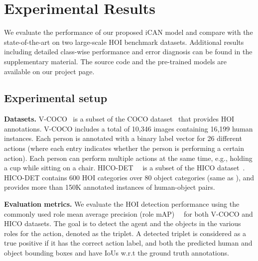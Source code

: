 \documentclass{bmvc2k}
\newlength\secmargin
\newcommand {\para}[1]{\vspace{1.5mm} \noindent \textbf{#1}}
\begin{document}
 \vspace{\secmargin}
\section{Experimental Results}
\label{sec:results}
\vspace{\secmargin}


We evaluate the performance of our proposed iCAN model and compare with the state-of-the-art on two large-scale HOI benchmark datasets.
Additional results including detailed class-wise performance and error diagnosis can be found in the supplementary material.
The source code and the pre-trained models are available on our project page.


\vspace{\secmargin}
\subsection{Experimental setup}
\vspace{\secmargin}

\para{Datasets.}
{V-COCO}~\cite{Gupta-SemanticRoleLabeling} is a subset of the COCO dataset~\cite{Lin-ECCV-MSCOCO} that provides HOI annotations. 
V-COCO includes a total of 10,346 images containing 16,199 human instances. 
Each person is annotated with a binary label vector for 26 different actions (where each entry indicates whether the person is performing a certain action).
Each person can perform multiple actions at the same time, e.g., holding a cup while sitting on a chair.
{HICO-DET}~~\cite{Chao-CVPR-HICO} is a subset of the HICO dataset~\cite{Chao-CVPR-HICO}.
HICO-DET contains 600 HOI categories over 80 object categories (same as \cite{Lin-ECCV-MSCOCO}), and provides more than 150K annotated instances of human-object pairs.


\para{Evaluation metrics.}
We evaluate the HOI detection performance using the commonly used role mean average precision (role mAP)~~\cite{Gupta-SemanticRoleLabeling} for both V-COCO and HICO datasets.
The goal is to detect the agent and the objects in the various roles for the action, denoted as the    triplet. 
A detected triplet is considered as a true positive if it has the correct action label, and both the predicted human and object bounding boxes  and  have IoUs  w.r.t the ground truth annotations.
\end{document}
